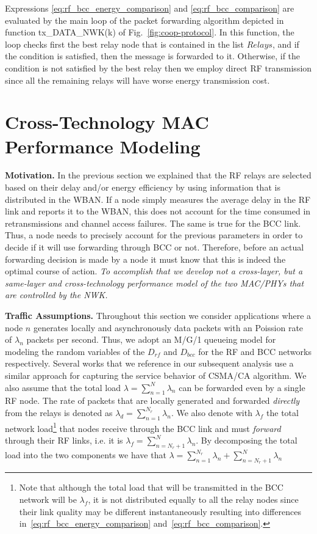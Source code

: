 \documentclass[10pt]{IEEEtran}
\newcounter{section:outage-analysis}
\begin{document}
Expressions \eqref{eq:rf_bcc_energy_comparison} and \eqref{eq:rf_bcc_comparison} are evaluated by the main loop of the packet forwarding algorithm depicted in function tx\_DATA\_NWK(k) of Fig.~\ref{fig:coop-protocol}. In this function, the loop checks first the best relay node that is contained in the list $Relays$, and if the condition is satisfied, then the message is forwarded to it. Otherwise, if the condition is not satisfied by the best relay then we employ direct RF transmission since all the remaining relays will have worse energy transmission cost.

\section{Cross-Technology MAC Performance Modeling}
\label{section:modeling-approach}
\textbf{Motivation.} In the previous section we explained that the RF relays are selected based on their delay and/or energy efficiency by using information that is distributed in the WBAN. If a node simply measures the average delay in the RF link and reports it to the WBAN, this does not account for the time consumed in retransmissions and channel access failures. The same is true for the BCC link. Thus, a node needs to precisely account for the previous parameters in order to decide if it will use forwarding through BCC or not. Therefore, before an actual forwarding decision is made by a node it must know that this is indeed the optimal course of action.
\textit{To accomplish that we develop not a cross-layer, but a same-layer and cross-technology performance model of the two MAC/PHYs that are controlled by the NWK.}

\textbf{Traffic Assumptions.} Throughout this section we consider applications where a node $n$ generates locally and asynchronously data packets with an Poission rate of $\lambda_n$ packets per second. Thus, we adopt an M/G/1 queueing model for modeling the random variables of the $D_{rf}$ and $D_{bcc}$ for the RF and BCC networks respectively. Several works that we reference in our subsequent analysis use a similar approach for capturing the service behavior of CSMA/CA algorithm. We also assume that the total load $\lambda= \sum^N_{n=1} \lambda_n $ can be forwarded even by a single RF node. The rate of packets that are locally generated and forwarded \textit{directly} from the relays is denoted as $\lambda_d=\sum_{n=1}^{N_r}\lambda_n$. We also denote with $\lambda_f$ the total network load\footnote{Note that although the total load that will be transmitted in the BCC network will be $\lambda_f$, it is not distributed equally to all the relay nodes since their link quality may be different instantaneously resulting into differences in~\eqref{eq:rf_bcc_energy_comparison} and~\eqref{eq:rf_bcc_comparison}.} that nodes receive through the BCC link and must \textit{forward} through their RF links, i.e. it is $\lambda_f=\sum_{n=N_r+1}^{N} \lambda_n$.  By decomposing the total load into the two components we have that $\lambda=\sum_{n=1}^{N_r}\lambda_n+ \sum_{n=N_r+1}^{N}\lambda_n$
\end{document}
